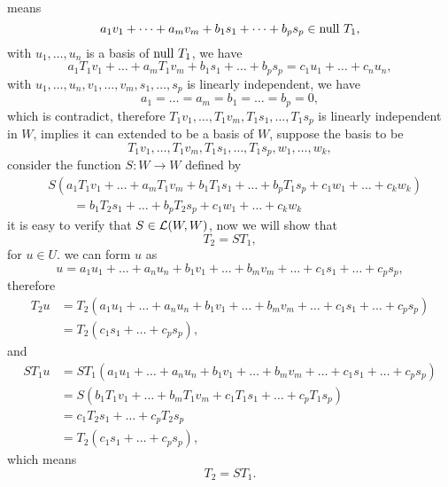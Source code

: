 \begin{enumerate}
\begin{solution}
            means 
            \[ a_1v_1 + \dots + a_mv_m + b_1s_1 + \dots + b_ps_p \in \text{null}~T_1, \]
            with $u_1, \ldots, u_n$ is a basis of $\text{null}~T_1$, we have 
            \[ a_1T_1v_1 + \dots + a_mT_1v_m + b_1s_1 + \dots + b_ps_p = c_1u_1 + \dots + c_nu_n ,\]
            with $u_1, \ldots, u_n, v_1, \ldots, v_m, s_1, \ldots, s_p$ is linearly independent, we have
            \[ a_1 = \dots = a_m = b_1 = \dots = b_p = 0,\]
            which is contradict, therefore $T_1v_1, \ldots, T_1v_m, T_1s_1, \ldots, T_1s_p$ is linearly independent in $W$, 
            implies it can extended to be a basis of $W$, 
            suppose the basis to be 
            \[ T_1v_1, \ldots, T_1v_m, T_1s_1, \ldots, T_1s_p, w_1, \ldots, w_k ,\]
            consider the function $S: W \to W$ defined by 
            \begin{align*}
                &S(a_1T_1v_1 + \dots + a_mT_1v_m + b_1T_1s_1 + \dots + b_pT_1s_p + c_1w_1 + \dots + c_kw_k) \\
                &\qquad = b_1T_2s_1 + \dots + b_pT_2s_p + c_1w_1 + \dots + c_kw_k
            \end{align*}
            it is easy to verify that $S \in \mathcal{L}(W, W)$, now we will show that 
            \[ T_2 = ST_1 ,\]
            for $u \in U$. we can form $u$ as 
            \[ u = a_1u_1 + \dots + a_nu_n + b_1v_1 + \dots + b_mv_m + \dots + c_1s_1 + \dots + c_ps_p ,\]
            therefore 
            \begin{align*}
                T_2u &= T_2(a_1u_1 + \dots + a_nu_n + b_1v_1 + \dots + b_mv_m + \dots + c_1s_1 + \dots + c_ps_p) \\
                     &= T_2(c_1s_1 + \dots + c_ps_p),
            \end{align*}
            and 
            \begin{align*}
                ST_1u &= ST_1(a_1u_1 + \dots + a_nu_n + b_1v_1 + \dots + b_mv_m + \dots + c_1s_1 + \dots + c_ps_p) \\
                        &= S(b_1T_1v_1 + \dots + b_mT_1v_m + c_1T_1s_1 + \dots + c_pT_1s_p) \\
                        &= c_1T_2s_1 + \dots + c_pT_2s_p \\
                        &= T_2(c_1s_1 + \dots + c_ps_p),
            \end{align*}
            which means 
            \[ T_2 = ST_1 .\]


\end{solution}
\end{enumerate}
